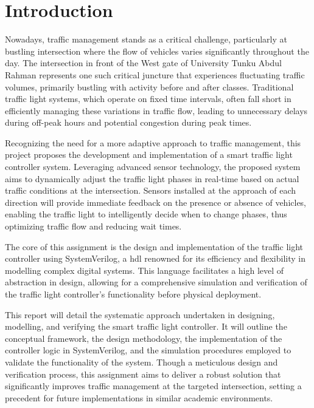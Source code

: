 \section{Introduction}
Nowadays, traffic management stands as a critical challenge, particularly at bustling intersection where the flow of vehicles varies significantly throughout the day. The intersection in front of the West gate of University Tunku Abdul Rahman represents one such critical juncture that experiences fluctuating traffic volumes, primarily bustling with activity before and after classes. Traditional traffic light systems, which operate on fixed time intervals, often fall short in efficiently managing these variations in traffic flow, leading to unnecessary delays during off-peak hours and potential congestion during peak times.

Recognizing the need for a more adaptive approach to traffic management, this project proposes the development and implementation of a smart traffic light controller system. Leveraging advanced sensor technology, the proposed system aims to dynamically adjust the traffic light phases in real-time based on actual traffic conditions at the intersection. Sensors installed at the approach of each direction will provide immediate feedback on the presence or absence of vehicles, enabling the traffic light to intelligently decide when to change phases, thus optimizing traffic flow and reducing wait times.

The core of this assignment is the design and implementation of the traffic light controller using SystemVerilog, a \ac{hdl} renowned for its efficiency and flexibility in modelling complex digital systems. This language facilitates a high level of abstraction in design, allowing for a comprehensive simulation and verification of the traffic light controller's functionality before physical deployment.

This report will detail the systematic approach undertaken in designing, modelling, and verifying the smart traffic light controller. It will outline the conceptual framework, the design methodology, the implementation of the controller logic in SystemVerilog, and the simulation procedures employed to validate the functionality of the system. Though a meticulous design and verification process, this assignment aims to deliver a robust solution that significantly improves traffic management at the targeted intersection, setting a precedent for future implementations in similar academic environments.

